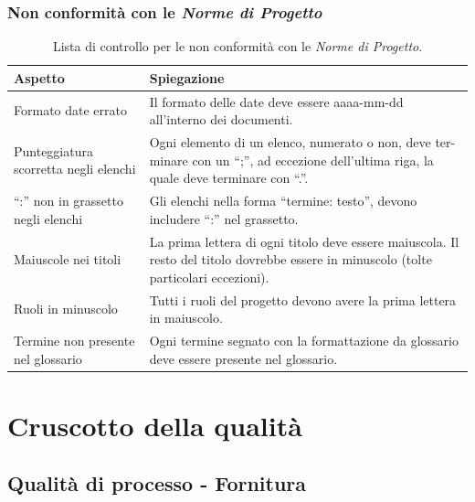 \documentclass[8pt]{article}
\begin{document}
\subsubsection{Non conformità con le \textit{Norme di Progetto}}
\renewcommand{\arraystretch}{2.5}
\begin{longtable}{|>{\centering}p{5cm}|>{\centering\arraybackslash}p{10cm}|}
\hline
\rowcolor{white}
    \textbf{Aspetto} & \textbf{Spiegazione} \\
\hline
\endfirsthead
\rowcolor{white}
    \caption{Lista di controllo per le non conformità con le \textit {Norme di Progetto}.}
    \label{table: Lista di controllo per le non conformità con le Norme di Progetto}
\endlastfoot
    Formato date errato & Il formato delle date deve essere aaaa-mm-dd all'interno dei documenti. \\
    \hline
    Punteggiatura scorretta negli elenchi &  Ogni elemento di un elenco, numerato o non, deve ter-
    minare con un ``;”, ad eccezione dell'ultima riga, la quale deve terminare con ``.”. \\ 
    \hline
    ``:” non in grassetto negli elenchi & Gli elenchi nella forma ``termine: testo”, devono
    includere ``:” nel grassetto. \\
    \hline
    Maiuscole nei titoli & La prima lettera di ogni titolo deve essere maiuscola. Il resto del
    titolo dovrebbe essere in minuscolo (tolte particolari eccezioni). \\
    \hline
    Ruoli in minuscolo & Tutti i ruoli del progetto devono avere la prima lettera in maiuscolo. \\
    \hline
    Termine non presente nel glossario & Ogni termine segnato con la formattazione da glossario deve essere presente nel glossario. \\
\hline
\end{longtable}
\newpage
\section{Cruscotto della qualità}
\subsection{Qualità di processo - Fornitura}
\end{document}
